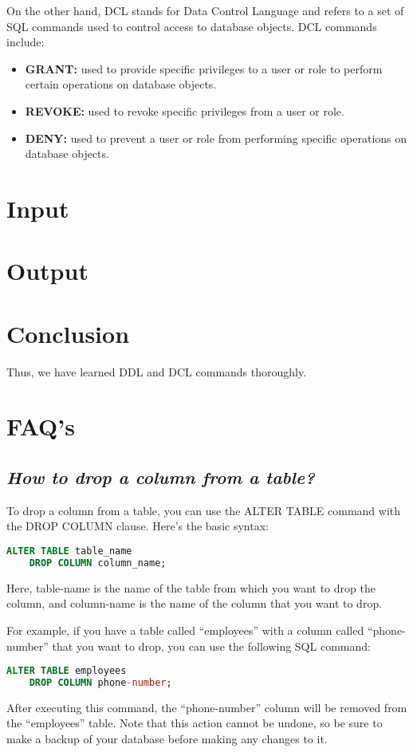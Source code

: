 \documentclass{article}
\begin{document}
On the other hand, DCL stands for Data Control Language and refers to a set of SQL commands used to control access to database objects. DCL commands include:
\begin{itemize}
    \item \textbf{GRANT:} used to provide specific privileges to a user or role to perform certain operations on database objects.
    \item \textbf{REVOKE:} used to revoke specific privileges from a user or role.
    \item \textbf{DENY:} used to prevent a user or role from performing specific operations on database objects.
\end{itemize}
\section{\textbf{Input}}
\section{\textbf{Output}}
\section{\textbf{Conclusion}}
Thus, we have learned DDL and DCL commands thoroughly.
\section{\textbf{FAQ's}}
\subsection{\textit{How to drop a column from a table?}}
To drop a column from a table, you can use the ALTER TABLE command with the DROP COLUMN clause. Here's the basic syntax:
\begin{lstlisting}[language=SQL]
    ALTER TABLE table_name
    DROP COLUMN column_name;
\end{lstlisting}
Here, table-name is the name of the table from which you want to drop the column, and column-name is the name of the column that you want to drop.

For example, if you have a table called ``employees'' with a column called ``phone-number'' that you want to drop, you can use the following SQL command:
\begin{lstlisting}[language=SQL]
    ALTER TABLE employees
    DROP COLUMN phone-number;
\end{lstlisting}
After executing this command, the ``phone-number'' column will be removed from the ``employees'' table. Note that this action cannot be undone, so be sure to make a backup of your database before making any changes to it.
\end{document}
